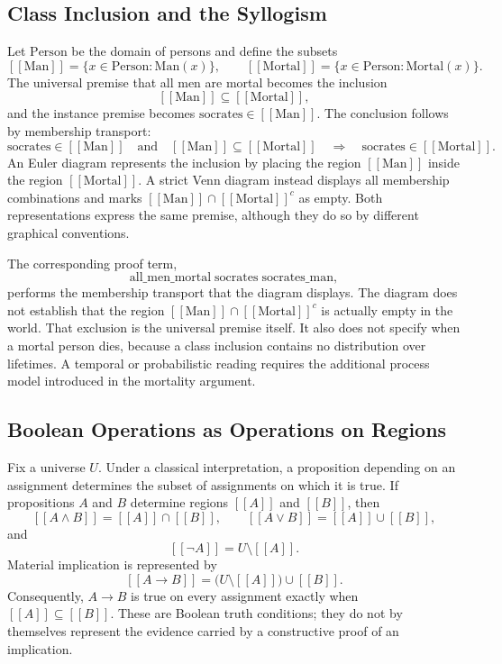 \documentclass[11pt]{article}
\theoremstyle{definition}
\theoremstyle{remark}
\newcommand{\llbracket}{[\![}
\newcommand{\rrbracket}{]\!]}
\begin{document}
\subsection{Class Inclusion and the Syllogism}

Let $\mathrm{Person}$ be the domain of persons and define the subsets
\[
\llbracket\mathrm{Man}\rrbracket=\{x\in\mathrm{Person}:\mathrm{Man}(x)\},
\qquad
\llbracket\mathrm{Mortal}\rrbracket=\{x\in\mathrm{Person}:\mathrm{Mortal}(x)\}.
\]
The universal premise that all men are mortal becomes the inclusion
\[
\llbracket\mathrm{Man}\rrbracket\subseteq\llbracket\mathrm{Mortal}\rrbracket,
\]
and the instance premise becomes $\mathrm{socrates}\in\llbracket\mathrm{Man}\rrbracket$. The conclusion follows by membership transport:
\[
\mathrm{socrates}\in\llbracket\mathrm{Man}\rrbracket
\quad\text{and}\quad
\llbracket\mathrm{Man}\rrbracket\subseteq\llbracket\mathrm{Mortal}\rrbracket
\quad\Longrightarrow\quad
\mathrm{socrates}\in\llbracket\mathrm{Mortal}\rrbracket.
\]
An Euler diagram represents the inclusion by placing the region $\llbracket\mathrm{Man}\rrbracket$
inside the region $\llbracket\mathrm{Mortal}\rrbracket$. A strict Venn diagram instead displays all
membership combinations and marks $\llbracket\mathrm{Man}\rrbracket\cap\llbracket\mathrm{Mortal}\rrbracket^{c}$ as empty. Both
representations express the same premise, although they do so by
different graphical conventions.

The corresponding proof term,
\[
\mathrm{all\_men\_mortal}\;
\mathrm{socrates}\;
\mathrm{socrates\_man},
\]
performs the membership transport that the diagram displays. The
diagram does not establish that the region $\llbracket\mathrm{Man}\rrbracket\cap\llbracket\mathrm{Mortal}\rrbracket^{c}$ is actually
empty in the world. That exclusion is the universal premise itself.
It also does not specify when a mortal person dies, because a class
inclusion contains no distribution over lifetimes. A temporal or
probabilistic reading requires the additional process model introduced
in the mortality argument.

\subsection{Boolean Operations as Operations on Regions}

Fix a universe $U$. Under a classical interpretation, a proposition
depending on an assignment determines the subset of assignments on
which it is true. If propositions $A$ and $B$ determine regions
$\llbracket A\rrbracket$ and $\llbracket B\rrbracket$, then
\[
\llbracket A\land B\rrbracket
=\llbracket A\rrbracket\cap\llbracket B\rrbracket,
\qquad
\llbracket A\lor B\rrbracket
=\llbracket A\rrbracket\cup\llbracket B\rrbracket,
\]
and
\[
\llbracket\neg A\rrbracket
=U\setminus\llbracket A\rrbracket.
\]
Material implication is represented by
\[
\llbracket A\to B\rrbracket
=
\big(U\setminus\llbracket A\rrbracket\big)
\cup\llbracket B\rrbracket.
\]
Consequently, $A\to B$ is true on every assignment exactly when
$\llbracket A\rrbracket\subseteq\llbracket B\rrbracket$.
These are Boolean truth conditions; they do not by themselves
represent the evidence carried by a constructive proof of an
implication.
\end{document}
